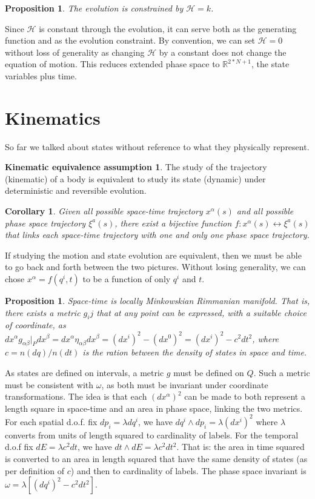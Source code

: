 \documentclass[aps,pra,10pt,twocolumn,floatfix,nofootinbib]{revtex4-1}
\newtheorem{cor}[thm]{Corollary}
\newtheorem{prop}[thm]{Proposition}
\theoremstyle{definition}
\newtheorem*{assump3}{Kinematic equivalence assumption}
\begin{document}
\begin{prop}\label{tdofConstrain}
The evolution is constrained by $\mathcal{H}=k$.
\end{prop}

Since $\mathcal{H}$ is constant through the evolution, it can serve both as the generating function and as the evolution constraint. By convention, we can set $\mathcal{H}=0$ without loss of generality as changing $\mathcal{H}$ by a constant does not change the equation of motion. This reduces extended phase space to $\mathbb{R}^{2*N + 1}$, the state variables plus time.

\section{Kinematics}
So far we talked about states without reference to what they physically represent.

\begin{assump3}\label{kinematicAssumption}
The study of the trajectory (kinematic) of a body is equivalent to study its state (dynamic) under deterministic and reversible evolution.
\end{assump3}

\begin{cor}\label{}
Given all possible space-time trajectory $x^\alpha(s)$ and all possible phase space trajectory $\xi^a(s)$, there exist a bijective function $f: x^\alpha(s) \leftrightarrow \xi^a(s)$ that links each space-time trajectory with one and only one phase space trajectory.
\end{cor}

If studying the motion and state evolution are equivalent, then we must be able to go back and forth between the two pictures. Without losing generality, we can chose $x^\alpha=f(q^i,t)$ to be a function of only $q^i$ and $t$.

\begin{prop}\label{locallyMinkowski}
Space-time is locally Minkowskian Rimmanian manifold. That is, there exists a metric $g_ij$ that at any point can be expressed, with a suitable choice of coordinate, as $dx^\alpha g_{\alpha \beta}|_P dx^\beta=dx^\alpha\eta_{\alpha \beta}dx^\beta=(dx^i)^2 - (dx^0)^2=(dx^i)^2 - c^2dt^2$, where $c=n(dq)/n(dt)$ is the ration between the density of states in space and time.
\end{prop}

As states are defined on intervals, a metric $g$ must be defined on $Q$. Such a metric must be consistent with $\omega$, as both must be invariant under coordinate transformations. The idea is that each $(dx^\alpha)^2$ can be made to both represent a length square in space-time and an area in phase space, linking the two metrics. For each spatial d.o.f. fix $dp_i=\lambda dq^i$, we have $dq^i \wedge dp_i = \lambda (dx^i)^2$ where $\lambda$ converts from units of length squared to cardinality of labels. For the temporal d.o.f fix $dE = \lambda c^2 dt$, we have $dt \wedge dE = \lambda c^2 dt^2$. That is: the area in time squared is converted to an area in length squared that have the same density of states (as per definition of $c$) and then to cardinality of labels. The phase space invariant is $\omega = \lambda [(dq^i)^2 - c^2 dt^2]$.
\end{document}
